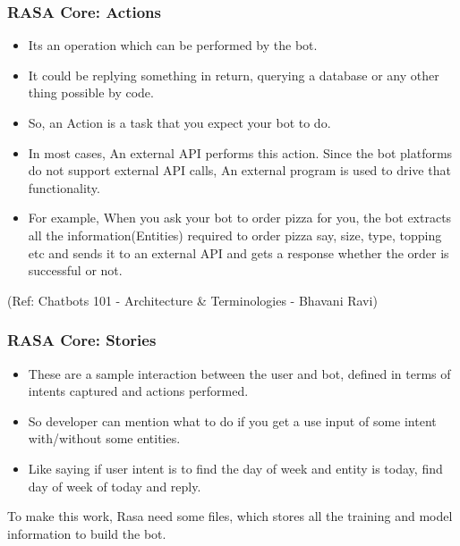  \begin{frame}[fragile]\frametitle{RASA Core: Actions}
\begin{itemize}
\item Its an operation which can be performed by the bot. 
\item It could be replying something in return, querying a database or any other thing possible by code.
\item So, an Action is a task that you expect your bot to do. 
\item In most cases, An external API performs this action. Since the bot platforms do not support external API calls, An external program is used to drive that functionality.
\item For example, When you ask your bot to order pizza for you, the bot extracts all the information(Entities) required to order pizza say, size, type, topping etc and sends it to an external API and gets a response whether the order is successful or not.

\end{itemize}

{\tiny (Ref: Chatbots 101 - Architecture \& Terminologies -  Bhavani Ravi)}

\end{frame}


 \begin{frame}[fragile]\frametitle{RASA Core: Stories}
\begin{itemize}
\item These are a sample interaction between the user and bot, defined in terms of intents captured and actions performed. 
\item So developer can mention what to do if you get a use input of some intent with/without some entities. 
\item Like saying if user intent is to find the day of week and entity is today, find day of week of today and reply.
\end{itemize}

To make this work, Rasa need some files, which stores all the training and model information to build the bot.
\end{frame}

